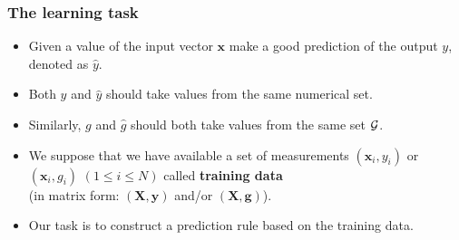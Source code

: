 \documentclass[notes]{beamer}          %
\newcommand{\vect}[1]{\bm{#1}}
\newif\iffull
\begin{document}
\iffull
\begin{frame}
\frametitle{Some notations}
    \begin{itemize}
        \item We denote an input variable with the symbol $x$ (scalar) or $\vect{x}$ (vector).
        \item The $i$-th component of a vector input $\vect{x}$ is denoted as $x_i$.
        \item Quantitative (numerical) outputs are denoted with $y$.
        \item Qualitative outputs are denoted with $g$ (from group) and take values from a set $\cal{G}$.
        \item Matrices are denoted with bold and uppercase letters $\vect{X}$\\
        for instance, a set of $N$ input $p$-vectors $\vect{x}_i$ ($1 \leq i \leq N)$ is "packed" in a $N \times p$ input matrix $\vect{X}$.
        \item Since by default vectors are assumed to be column vectors, the rows of $\vect{X}$ are the transposes $\vect{x}_i^T$.
    \end{itemize}
\end{frame}
\fi

\begin{frame}
\frametitle{The learning task}
    \begin{itemize}
        \item Given a value of the input vector $\vect{x}$ make a good prediction of the output $y$, denoted as $\hat{y}$.
        \item Both $y$ and $\hat{y}$ should take values from the same numerical set.
        \item Similarly, $g$ and $\hat{g}$ should both take values from the same set $\cal{G}$.
         \item We suppose that we have available a set of measurements $(\vect{x}_i,y_i)$ or $(\vect{x}_i,g_i)$ $(1 \leq i \leq N)$ called {\bf training data} \\
         (in matrix form: $(\vect{X},\vect{y})$ and/or $(\vect{X},\vect{g})$).
        \item Our task is to construct a prediction rule based on the training data.

    \end{itemize}

\end{frame}
\end{document}
